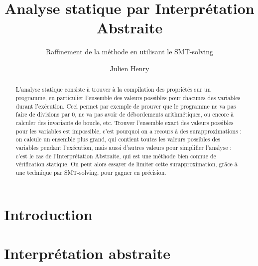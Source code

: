 \documentclass{llncs}
\title{Analyse statique par Interprétation Abstraite}
\subtitle{Raffinement de la méthode en utilisant le SMT-solving}
\author{Julien Henry}
\institute{CNRS - Verimag}
\begin{document}
\maketitle

\begin{abstract}
	L'analyse statique consiste à trouver à la compilation des propriétés sur un
	programme, en particulier l'ensemble des valeurs possibles pour chacunes des
	variables durant l'exécution. Ceci permet par exemple de prouver que le
	programme ne va pas faire de divisions par 0, ne va pas avoir de
	débordements arithmétiques, ou encore à calculer des invariants de boucle,
	etc. Trouver l'ensemble exact des valeurs possibles pour les variables est
	impossible, c'est pourquoi on a recours à des surapproximations : on calcule
	un ensemble plus grand, qui contient toutes les valeurs possibles des
	variables pendant l'exécution, mais aussi d'autres valeurs pour simplifier
	l'analyse : c'est le cas de l'Interprétation Abstraite, qui est une méthode
	bien connue de vérification statique.  
	On peut alors essayer de limiter cette surapproximation, grâce à une
	technique par SMT-solving, pour gagner en précision.
\end{abstract}

\section{Introduction}


\section{Interprétation abstraite}
\end{document}
